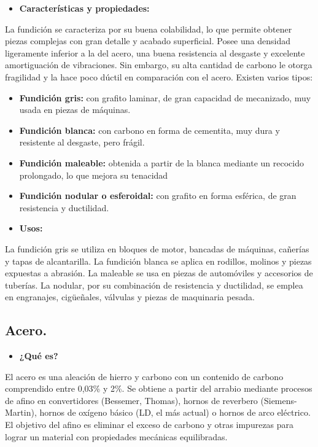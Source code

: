 \documentclass[12pt,a4paper]{article}
\begin{document}
\begin{itemize}
    \item \textbf{Características y propiedades:}
\end{itemize}

La fundición se caracteriza por su buena colabilidad, lo que permite obtener piezas complejas con gran detalle y acabado superficial. Posee una densidad ligeramente inferior a la del acero, una buena resistencia al desgaste y excelente amortiguación de vibraciones. Sin embargo, su alta cantidad de carbono le otorga fragilidad y la hace poco dúctil en comparación con el acero.
Existen varios tipos:

\begin{itemize}
    \item \textbf{Fundición gris:} con grafito laminar, de gran capacidad de mecanizado, muy usada en piezas de máquinas.
    \item \textbf{Fundición blanca:} con carbono en forma de cementita, muy dura y resistente al desgaste, pero frágil.
    \item \textbf{Fundición maleable:} obtenida a partir de la blanca mediante un recocido prolongado, lo que mejora su tenacidad
    \item\textbf{Fundición nodular o esferoidal:} con grafito en forma esférica, de gran resistencia y ductilidad.
    \item \textbf{Usos:}
\end{itemize}

La fundición gris se utiliza en bloques de motor, bancadas de máquinas, cañerías y tapas de alcantarilla. La fundición blanca se aplica en rodillos, molinos y piezas expuestas a abrasión. La maleable se usa en piezas de automóviles y accesorios de tuberías. La nodular, por su combinación de resistencia y ductilidad, se emplea en engranajes, cigüeñales, válvulas y piezas de maquinaria pesada.

\subsection{Acero.}
\begin{itemize}
    \item \textbf{¿Qué es?}
\end{itemize}

El acero es una aleación de hierro y carbono con un contenido de carbono comprendido entre 0,03\% y 2\%. Se obtiene a partir del arrabio mediante procesos de afino en convertidores (Bessemer, Thomas), hornos de reverbero (Siemens-Martin), hornos de oxígeno básico (LD, el más actual) o hornos de arco eléctrico. El objetivo del afino es eliminar el exceso de carbono y otras impurezas para lograr un material con propiedades mecánicas equilibradas.
\end{document}
